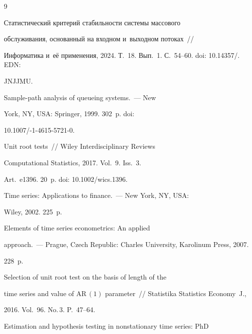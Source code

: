 {\small\frenchspacing


{%




\begin{thebibliography}{9}




 Статистический критерий ста\-биль\-ности сис\-те\-мы массового 


обслуживания, основанный на входном и~выходном потоках~/\!\!/


 Информатика и~её применения, 2024. Т.~18. Вып.~1. С.~54--60. doi: 10.14357\!/. EDN: 


JNJJMU.




 Sample-path analysis of queueing systems.~--- New 


York, NY, USA: Springer, 1999. 302~p. doi:  


10.1007\!/-1-4615-5721-0.




 Unit root tests~/\!\!/ Wiley Interdisciplinary Reviews 


Computational Statistics, 2017. Vol.~9. Iss.~3. 


Art.~e1396.  20~p. doi: 10.1002\!/\!wics.1396.




 Time series: Applications to finance.~--- New York, NY, USA: 


Wiley, 2002. 225~p.




 Elements of time series econometrics: An applied 


approach.~--- Prague, Czech Republic: Charles University, Karolinum Press, 2007. 


228~p.




 Selection of unit root test on the basis of length of the 


time series and value of $\mathrm{AR}\,(1)$ parameter~/\!\!/ Statistika Statistics Economy~J., 


2016. Vol.~96. No.\,3. P.~47--64.




 Estimation and hypothesis testing in nonstationary time series: PhD 



\end{thebibliography}}}
